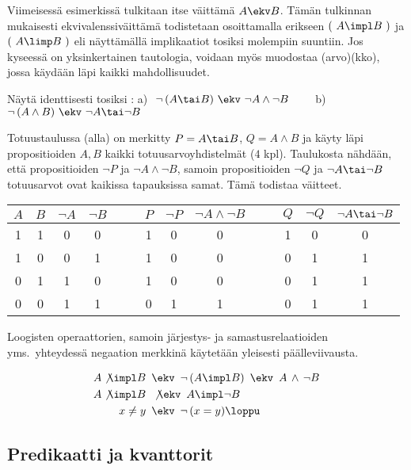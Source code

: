 Viimeisessä esimerkissä tulkitaan itse väittämä $A \ekv B$. Tämän tulkinnan mukaisesti 
ekvivalenssiväittämä todistetaan osoittamalla erikseen \fbox{\impl} $(\ A \impl B\ )$ ja
\fbox{\limp} $(\ A \limp B\ )$ eli näyttämällä implikaatiot tosiksi molempiin suuntiin.
Jos kyseessä on yksinkertainen tautologia, voidaan myös muodostaa
%
(arvo)(kko), jossa käydään läpi kaikki mahdollisuudet.
\begin{Exa} \label{de Morgan logiikassa} Näytä identtisesti tosiksi
: \vspace{1mm}\newline
a)\,\ $\neg\,(A \tai B)\ \ekv\ \neg A \wedge \neg B \qquad$
b)\,\ $\neg\,(A \wedge B)\ \ekv\ \neg A \tai \neg B$
\end{Exa}
\ratk Totuustaulussa (alla) on merkitty $P = A \tai B$, $Q = A \wedge B$ ja käyty läpi
propositioiden $A,B$ kaikki totuusarvoyhdistelmät  ($4$ kpl). Taulukosta nähdään, että
propositioiden $\neg P$ ja $\neg A \wedge \neg B$, samoin propositioiden $\neg Q$ ja 
\mbox{$\neg A \tai \neg B$} totuusarvot ovat kaikissa tapauksissa samat. Tämä todistaa
väitteet. \loppu

\begin{tabular}{cccccccccccccc}
$A$ & $B$ & $\neg A$ & $\neg B$ &  &  & $P$ & $\neg P$ & $\neg A \wedge \neg B$ & & & 
$Q$ & $\neg Q$ & $\neg A \tai \neg B$ \\ \hline
1 & 1 & 0 & 0 & & & 1 & 0 & 0 & & & 1 & 0 & 0 \\
1 & 0 & 0 & 1 & & & 1 & 0 & 0 & & & 0 & 1 & 1 \\
0 & 1 & 1 & 0 & & & 1 & 0 & 0 & & & 0 & 1 & 1 \\
0 & 0 & 1 & 1 & & & 0 & 1 & 1 & & & 0 & 1 & 1
\end{tabular}

Loogisten operaattorien, samoin järjestys- ja samastusrelaatioiden yms.\ yhteydessä negaation 
merkkinä käytetään yleisesti päälleviivausta.
\begin{Exa}
\begin{align*}
A \not\impl B \,\ &\ekv \,\ \neg\,( A \impl B ) \,\ \ekv \,\ A\,\wedge\,\neg B \\
A \not\impl B \,\ &\not\ekv \,\ A \impl \neg B \\
x \neq y \,\      &\ekv \,\ \neg\,(x=y) \loppu
\end{align*}
\end{Exa}

\subsection*{Predikaatti ja kvanttorit}

